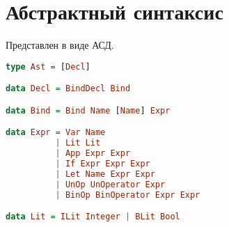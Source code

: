 \documentclass[12pt, a4paper] {ncc}
\begin{document}
\section{Абстрактный синтаксис}

Представлен в виде АСД.

\begin{lstlisting}[language=Haskell]
type Ast = [Decl]

data Decl = BindDecl Bind

data Bind = Bind Name [Name] Expr

data Expr = Var Name
		  | Lit Lit
          | App Expr Expr
          | If Expr Expr Expr
		  | Let Name Expr Expr
          | UnOp UnOperator Expr
		  | BinOp BinOperator Expr Expr

data Lit = ILit Integer | BLit Bool

\end{lstlisting}
\end{document}
